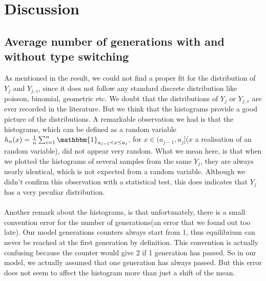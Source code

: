 \section{Discussion}
\subsection{Average number of generations with and without type switching}
As mentioned in the result, we could not find a proper fit for the distribution of $Y_{j}$ and $Y_{j,s}$, since it does not follow any standard discrete distribution like poisson, binomial, geometric etc. We doubt that the distributions of $Y_j$ or $Y_{j,s}$ are ever recorded in the literature. But we think that the histograms provide a good picture of the distributions. A remarkable observation we had is that the histograms, which can be defined as a random variable $h_n(x)=\frac{1}{n}\sum^n_{i=1}\mathbbm{1}_{a_{j-1}<x\leq a_j}$, for $x\in (a_{j-1},a_j]$($x$ a realisation of an random variable),  did not appear very random. What we mean here, is that when we plotted the histograms of several samples from the same $Y_j$, they are always nearly identical, which is not expected from a random variable. Although we didn't confirm this observation with a statistical test, this does indicates that $Y_j$ has a very peculiar distribution.\\
\\
Another remark about the histograms, is that unfortunately, there is a small convention error for the number of generations(an error that we found out too late). Our model generations counters always start from 1, thus equilibrium can never be reached at the first generation by definition. This convention is actually confusing because the counter would give 2 if 1 generation has passed. So in our model, we actually assumed that one generation has always passed. But this error does not seem to affect the histogram more than just a shift of the mean.\\
\\


  